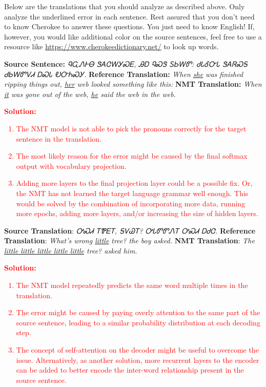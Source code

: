\begin{parts}
    Below are the translations that you should analyze as described above. Only analyze the underlined error in each sentence. Rest assured that you don't need to know Cherokee to answer these questions. You just need to know English! If, however, you would like additional color on the source sentences, feel free to use a resource like \url{https://www.cherokeedictionary.net/} to look up words.

    \begin{subparts}
        \subpart[2]
        \textbf{Source Sentence:} \textit{{\cherokeefam ᏄᏩᏁᎰᎾ ᏕᎪᏣᎳᎩᏍᎬ, ᎯᎠ ᏄᏍᏕ ᏚᏏᎳᏛ: ᏧᏓᎴᏅᏓ ᏕᎪᏒᏍᎦ ᏧᏏᎳᏛᏙᏗ ᎠᏍᏓ ᎧᏅᏂᏍᎩ.        }}\newline
        \textbf{Reference Translation:} \textit{When \underline{she} was finished ripping things out, \underline{her} web looked something like this: }\newline
        \textbf{NMT Translation:} \textit{When \underline{it} was gone out of the web, \underline{he} said the web in the web.}

		\textcolor{red}{\textbf{Solution: }
		\begin{enumerate}
		\item The NMT model is not able to pick the pronouns correctly for the target sentence in the translation. 
		\item The most likely reason for the error might be caused by the final softmax output with vocabulary projection. 
		\item Adding more layers to the final projection layer could be a possible fix. Or, the NMT has not learned the target language grammar well enough. This would be solved by the combination of incorporating more data, running more epochs, adding more layers, and/or increasing the size of hidden layers.		
		\end{enumerate}
		}
		  
        
        
        \subpart[2]
        \textbf{Source Translation}: \textit{{\cherokeefam ᎤᏍᏗ ᎢᏈᎬᎢ, ᎦᏙᏊᎢ? ᎤᏓᏛᏛᏁᎢ ᎤᏍᏗ ᎠᏧᏣ.}}\newline
        \textbf{Reference Translation}: \textit{What's wrong \underline{little} tree? the boy asked.}\newline
        \textbf{NMT Translation}: \textit{ The \underline{little little little little little} tree? asked him.}

		\textcolor{red}{\textbf{Solution: }
		\begin{enumerate}		
		\item The NMT model repeatedly predicts the same word multiple times in the translation. 
		\item The error might be caused by paying overly attention to the same part of the source sentence, leading to a similar probability distribution at each decoding step. 
		\item The concept of self-attention on the decoder might be useful to overcome the issue. Alternatively, as another solution, more recurrent layers to the encoder can be added to better encode the inter-word relationship present in the source sentence.
		\end{enumerate}
		}          
        

\end{subparts}
\end{parts}
